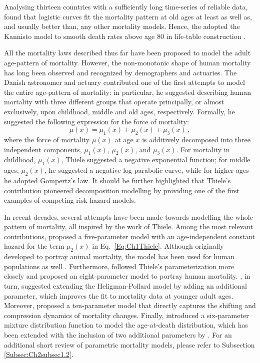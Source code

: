 \documentclass[Thesis]{subfiles}
\begin{document}
Analysing thirteen countries with a sufficiently long time-series of reliable data, \cite{thatcher1998force} found that logistic curves fit the mortality pattern at old ages at least as well as, and usually better than, any other mortality models. Hence, the \cite{HMD} adopted the Kannisto model to smooth death rates above age 80 in life-table construction \cite[see][p.~34]{wilmoth2019protocol}.

All the mortality laws described thus far have been proposed to model the adult age-pattern of mortality. However, the non-monotonic shape of human mortality has long been observed and recognized by demographers and actuaries. The Danish astronomer and actuary \cite{thiele1871mathematical} contributed one of the first attempts to model the entire age-pattern of mortality: in particular, he suggested describing human mortality with three different groups that operate principally, or almost exclusively, upon childhood, middle and old ages, respectively. Formally, he suggested the following expression for the force of mortality:
%
\begin{equation}\label{Eq:Ch1Thiele}
\mu(x)=\mu_{1}(x)+\mu_{2}(x)+\mu_{3}(x)  \, ,
\end{equation}
%
where the force of mortality $\mu(x)$ at age $x$ is additively decomposed into three independent components, $\mu_{1}(x)$, $\mu_{2}(x)$, and $\mu_{3}(x)$. For mortality in childhood, $\mu_{1}(x)$, Thiele suggested a negative exponential function; for middle ages, $\mu_{2}(x)$, he suggested a negative log-parabolic curve, while for higher ages he adopted Gompertz's law. It should be further highlighted that Thiele's contribution pioneered decomposition modelling by providing one of the first examples of competing-risk hazard models. 

In recent decades, several attempts have been made towards modelling the whole pattern of mortality, all inspired by the work of Thiele. Among the most relevant contributions, \cite{siler1979competing} proposed a five-parameter model with an age-independent constant hazard for the term $\mu_{2}(x)$ in Eq.~\eqref{Eq:Ch1Thiele}. Although originally developed to portray animal mortality, the model has been used for human populations as well \cite[see, e.g.,][]{siler1983parameters,gage1993decline,canudas2005contributions,canudas2008modal,bergeron2015decomposing}. Furthermore, \cite{heligman1980age} followed Thiele's parameterization more closely and proposed an eight-parameter model to portray human mortality. \cite{kostaki1992nine}, in turn, suggested extending the Heligman-Pollard model by adding an additional parameter, which improves the fit to mortality data at younger adult ages. Moreover, \cite{de2016new} proposed a ten-parameter model that directly captures the shifting and compression dynamics of mortality changes. Finally, \cite{mazzuco2018mortality} introduced a six-parameter mixture distribution function to model the age-at-death distribution, which has been extended with the inclusion of two additional parameters by \cite{zanotto2017mixture}. For an additional short review of parametric mortality models, please refer to Subsection \ref{Subsec:Ch2subsec1.2}.   
\end{document}
